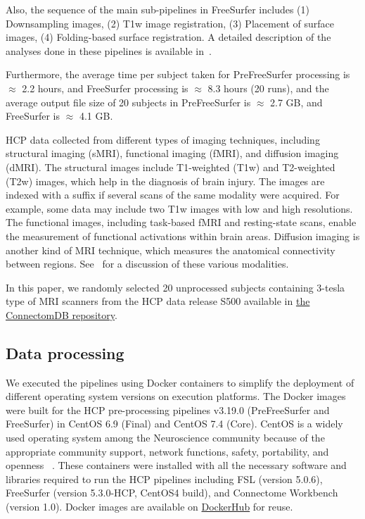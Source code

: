 \documentclass[a4paper,num-refs]{oup-contemporary}
\begin{document}
Also, the sequence of the main sub-pipelines in FreeSurfer includes 
(1) Downsampling images, 
(2) T1w image registration, 
(3) Placement of surface images, 
(4) Folding-based surface registration.
A detailed description of the analyses done in these
pipelines is available in~\cite{glasser2013}. 

Furthermore, the average time per subject taken for PreFreeSurfer processing is $\approx$ 2.2 hours, 
and FreeSurfer processing is $\approx$ 8.3 hours (20 runs), 
and the average output file size of 20 subjects in PreFreeSurfer is $\approx$ 2.7 GB, 
and FreeSurfer is $\approx$ 4.1 GB.

HCP data collected from different types of imaging techniques, including 
structural imaging (sMRI), functional imaging (fMRI), and diffusion imaging (dMRI).
The structural images include T1-weighted (T1w) and T2-weighted (T2w) images, which 
help in the diagnosis of brain injury.
The images are indexed with a suffix if several scans of the same modality were acquired.
For example, some data may include two T1w images with low and high resolutions.
The functional images, including task-based fMRI and resting-state scans, 
enable the measurement of functional activations within brain areas. 
Diffusion imaging is another kind of MRI technique, which measures 
the anatomical connectivity between regions.
See~\cite{van2013wu} for a discussion of these various modalities.

In this paper, we randomly selected 20 unprocessed subjects 
containing 3-tesla type of MRI scanners from the HCP data release S500 
available in \href{https://db.humanconnectome.org}{the ConnectomDB repository}. 


\subsection{Data processing}

We executed the pipelines using Docker containers to simplify the 
deployment of different operating system versions on execution 
platforms. 
The Docker images were built for the HCP pre-processing 
pipelines v3.19.0 (PreFreeSurfer and FreeSurfer) in 
CentOS 6.9 (Final) and CentOS 7.4 (Core). 
CentOS is a widely used operating system among the Neuroscience community because of 
the appropriate community support, network functions, safety, portability, and openness
~\cite{hanke2011neuroscience}.
These containers were installed with all the necessary software and libraries 
required to run the HCP pipelines including FSL (version 5.0.6), 
FreeSurfer (version 5.3.0-HCP, CentOS4 build), and Connectome Workbench (version 1.0).
Docker images are available on 
\href{https://hub.docker.com/r/bigdatalabteam/hcp-prefreesurfer/}{DockerHub}
for reuse.
\end{document}
